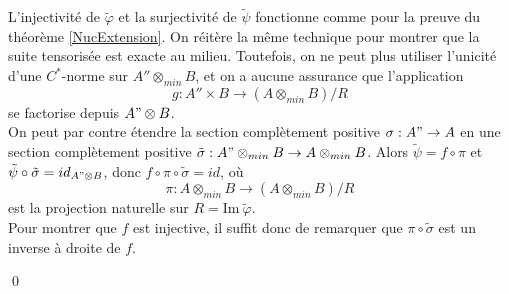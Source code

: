 \begin{dem}
L'injectivité de $\tilde\varphi$ et la surjectivité de $\tilde\psi$ fonctionne comme pour la preuve du théorème \ref{NucExtension}. On réitère la même technique pour montrer que la suite tensorisée est exacte au milieu. Toutefois, on ne peut plus utiliser l'unicité d'une $C^*$-norme sur $A''\otimes_{min} B$, et on a aucune assurance que l'application 
\[g : A''\times B \rightarrow (A\otimes_{min} B) / R\]
se factorise depuis $A"\otimes B$. \\

On peut par contre étendre la section complètement positive $\sigma : A"\rightarrow A$ en une section complètement positive $\tilde\sigma : A"\otimes_{min} B\rightarrow A\otimes_{min} B$. Alors $\tilde\psi = f\circ\pi$ et $\tilde\psi \circ \tilde\sigma = id_{A"\otimes B}$, donc $f\circ \pi\circ\tilde\sigma= id$, où 
\[\pi : A\otimes_{min} B \rightarrow (A\otimes_{min} B )/ R\]
est la projection naturelle sur $R=\text{Im}\ \tilde\varphi$.\\

 Pour montrer que $f$ est injective, il suffit donc de remarquer que $\pi\circ \tilde\sigma$ est un inverse à droite de $f$.

\qed
\end{dem}